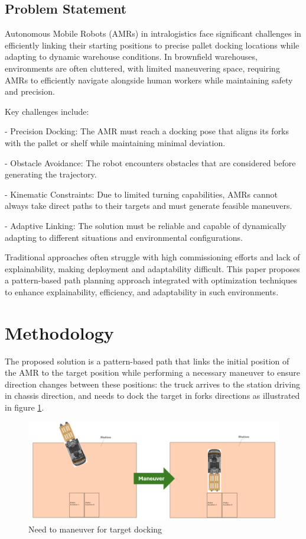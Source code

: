 \documentclass{amam}                %
\begin{document}
\subsection{Problem Statement}
Autonomous Mobile Robots (AMRs) in intralogistics face significant challenges in efficiently linking their starting positions to precise pallet docking locations while adapting to dynamic warehouse conditions. In brownfield warehouses, environments are often cluttered, with limited maneuvering space, requiring AMRs to efficiently navigate alongside human workers while maintaining safety and precision.

Key challenges include:

- Precision Docking: The AMR must reach a docking pose that aligns its forks with the pallet or shelf while maintaining minimal deviation.

- Obstacle Avoidance: The robot encounters obstacles that are considered before generating the trajectory.

- Kinematic Constraints: Due to limited turning capabilities, AMRs cannot always take direct paths to their targets and must generate feasible maneuvers.

- Adaptive Linking: The solution must be reliable and capable of dynamically adapting to different situations and environmental configurations.

Traditional approaches often struggle with high commissioning efforts and lack of explainability, making deployment and adaptability difficult. This paper proposes a pattern-based path planning approach integrated with optimization techniques to enhance explainability, efficiency, and adaptability in such environments.

\section{Methodology}
The proposed solution is a pattern-based path that links the initial position of the AMR to the target position while performing a necessary maneuver to ensure direction changes between these positions: the truck arrives to the station driving in chassis direction, and needs to dock the target in forks directions as illustrated in figure \ref{maneuver}.
\begin{figure}[t]
  \centering \includegraphics[width=1.0\linewidth]{maneuver.png}
  \caption{Need to maneuver for target docking}
  \label{maneuver}
\end{figure}
\end{document}
